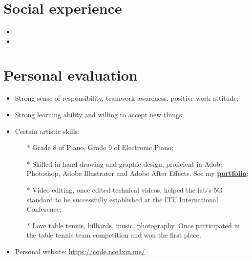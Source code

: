 \documentclass{resume}
\begin{document}
\section{Social experience}
\begin{itemize}[parsep=0.5ex]
  \item {}
  \item {}
\end{itemize}

\section{Personal evaluation}
\begin{itemize}[parsep=0.5ex]
  \item Strong sense of responsibility, teamwork awareness, positive work attitude;
  \item Strong learning ability and willing to accept new things;
  \item Certain artistic skills:
  \begin{itemize}[parsep=0.5ex]
    \item[*] Grade 8 of Piano, Grade 9 of Electronic Piano;
    \item[*] Skilled in hand drawing and graphic design, proficient in Adobe Photoshop, Adobe Illustrator and Adobe After Effects. See my \href{https://nce3xin.github.io/design-portfolio/}{\textbf{portfolio}};
    \item[*] Video editing, once edited technical videos, helped the lab's 5G standard to be successfully established at the ITU International Conference;
    \item[*] Love table tennis, billiards, music, photography. Once participated in the table tennis team competition and won the first place.
  \end{itemize}
  \item Personal website: \href{https://code.nce3xin.me/}{https://code.nce3xin.me/}
\end{itemize}

%
%
\end{document}
